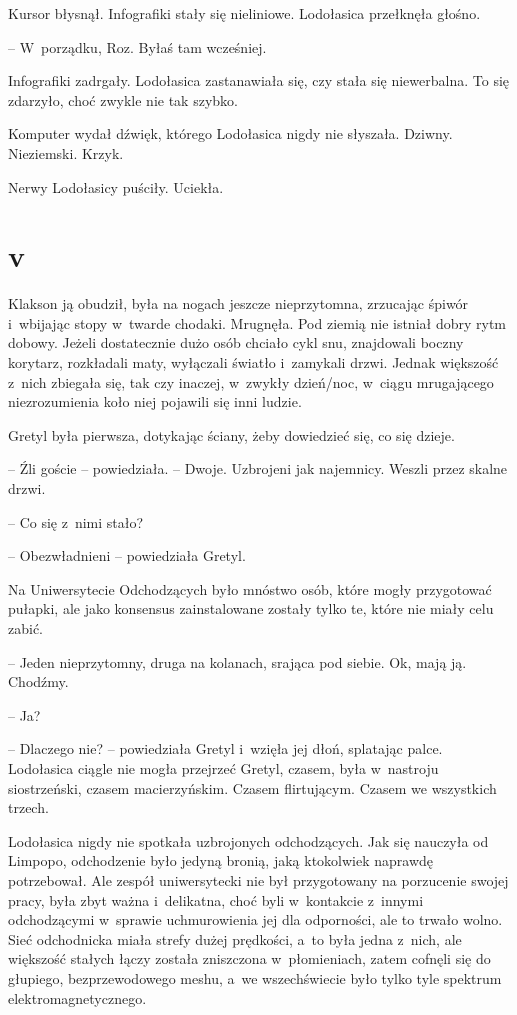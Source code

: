 \documentclass[oneside,polish,11pt,sfheadings]{mwbk}
\begin{document}
Kursor błysnął. Infografiki stały się nieliniowe. Lodołasica przełknęła
głośno.

-- W~porządku, Roz. Byłaś tam wcześniej.

Infografiki zadrgały. Lodołasica zastanawiała się, czy stała się
niewerbalna. To się zdarzyło, choć zwykle nie tak szybko.

Komputer wydał dźwięk, którego Lodołasica nigdy nie słyszała. Dziwny.
Nieziemski. Krzyk.

Nerwy Lodołasicy puściły. Uciekła.

\chapter*{v}

Klakson ją obudził, była na nogach jeszcze nieprzytomna, zrzucając
śpiwór i~wbijając stopy w~twarde chodaki. Mrugnęła. Pod ziemią nie
istniał dobry rytm dobowy. Jeżeli dostatecznie dużo osób chciało cykl
snu, znajdowali boczny korytarz, rozkładali maty, wyłączali światło i~zamykali drzwi. Jednak większość z~nich zbiegała się, tak czy inaczej, w~zwykły dzień/noc, w~ciągu mrugającego niezrozumienia koło niej pojawili
się inni ludzie.

Gretyl była pierwsza, dotykając ściany, żeby dowiedzieć się, co się
dzieje.

-- Źli goście -- powiedziała. -- Dwoje. Uzbrojeni jak najemnicy. Weszli
przez skalne drzwi.

-- Co się z~nimi stało?

-- Obezwładnieni -- powiedziała Gretyl. 

Na Uniwersytecie Odchodzących było
mnóstwo osób, które mogły przygotować pułapki, ale jako konsensus
zainstalowane zostały tylko te, które nie miały celu zabić. 

-- Jeden
nieprzytomny, druga na kolanach, srająca pod siebie. Ok, mają ją.
Chodźmy.

-- Ja?

-- Dlaczego nie? -- powiedziała Gretyl i~wzięła jej dłoń, splatając palce.
Lodołasica ciągle nie mogła przejrzeć Gretyl, czasem, była w~nastroju
siostrzeński, czasem macierzyńskim. Czasem flirtującym. Czasem we
wszystkich trzech.

Lodołasica nigdy nie spotkała uzbrojonych odchodzących. Jak się nauczyła
od Limpopo, odchodzenie było jedyną bronią, jaką ktokolwiek naprawdę
potrzebował. Ale zespół uniwersytecki nie był przygotowany na porzucenie
swojej pracy, była zbyt ważna i~delikatna, choć byli w~kontakcie z~innymi odchodzącymi w~sprawie uchmurowienia jej dla odporności, ale to
trwało wolno. Sieć odchodnicka miała strefy dużej prędkości, a~to była
jedna z~nich, ale większość stałych łączy została zniszczona w~płomieniach, zatem cofnęli się do głupiego, bezprzewodowego meshu, a~we
wszechświecie było tylko tyle spektrum elektromagnetycznego.
\end{document}
